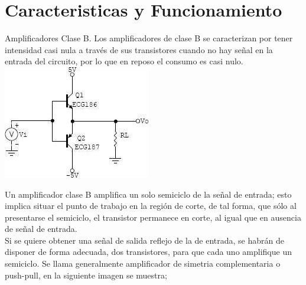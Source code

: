 \documentclass[10pt,a4paper]{article}
\begin{document}
\part{Caracteristicas y Funcionamiento }
Amplificadores Clase B. Los amplificadores de clase B se caracterizan por tener intensidad casi nula a través de sus transistores cuando no hay señal en la entrada del circuito, por lo que en reposo el consumo es casi nulo.\\
\centering
\includegraphics[scale=.90]{Amp.jpg}\\
\raggedright
Un amplificador clase B amplifica un solo semiciclo de la señal de entrada; esto implica situar el punto de trabajo en la región de corte, de tal forma, que sólo al presentarse el semiciclo, el transistor permanece en corte, al igual que en ausencia de señal de entrada.\\
Si se quiere obtener una señal de salida reflejo de la de entrada, se habrán de disponer de forma adecuada, dos transistores, para que cada uno amplifique un semiciclo. Se llama generalmente amplificador de simetria complementaria o push-pull, en la siguiente imagen se muestra;\\
\centering
\end{document}
